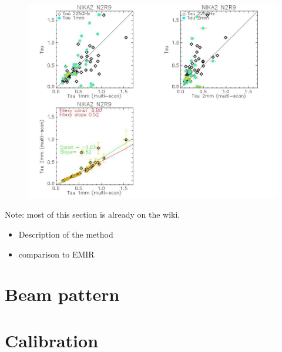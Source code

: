 \documentclass[a4paper, 11pt]{article} %
\begin{document}
\begin{figure}
\begin{center}
\includegraphics[clip, angle=0, scale = 0.5]{Figures/test_allskd_N2R9.jpg}
\caption{}
\label{fig:fov}
\end{center}
\end{figure}


Note: most of this section is already on the wiki.
\begin{itemize}
\item Description of the method
\item comparison to EMIR
\end{itemize}

\section{Beam pattern}

\section{Calibration}
\end{document}
